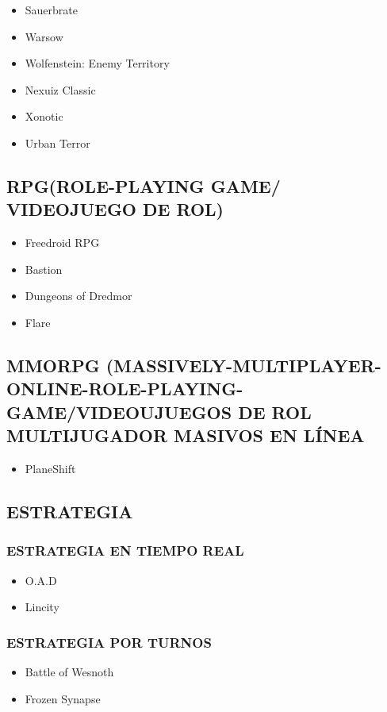 \begin{itemize}
\item Sauerbrate
\item Warsow
\item Wolfenstein: Enemy Territory
\item Nexuiz Classic
\item Xonotic
\item Urban Terror
\end{itemize}


\subsection*{RPG(ROLE-PLAYING GAME/ VIDEOJUEGO DE ROL)}

\begin{itemize}
\item Freedroid RPG
\item Bastion
\item Dungeons of Dredmor
\item Flare
\end{itemize}

\subsection*{MMORPG (MASSIVELY-MULTIPLAYER-ONLINE-ROLE-PLAYING-GAME/VIDEOUJUEGOS DE ROL MULTIJUGADOR MASIVOS EN LÍNEA}

\begin{itemize}
\item PlaneShift
\end{itemize}

\subsection*{ESTRATEGIA}
\subsubsection*{ESTRATEGIA EN TIEMPO REAL}
\begin{itemize}
\item O.A.D
\item Lincity
\end{itemize}
\subsubsection*{ESTRATEGIA POR TURNOS}
\begin{itemize}
\item Battle of Wesnoth
\item Frozen Synapse
\end{itemize}

